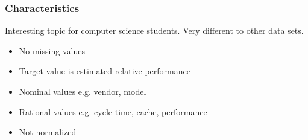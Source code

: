 \documentclass[aspectratio=169]{beamer}
\begin{document}
\begin{frame}{}
\frametitle{Characteristics}
Interesting topic for computer science students. Very different to other data sets.
\begin{itemize}
\item No missing values
\item Target value is estimated relative performance
\item Nominal values e.g. vendor, model
\item Rational values e.g. cycle time, cache, performance
\item Not normalized
\end{itemize}
\end{frame}
\end{document}
